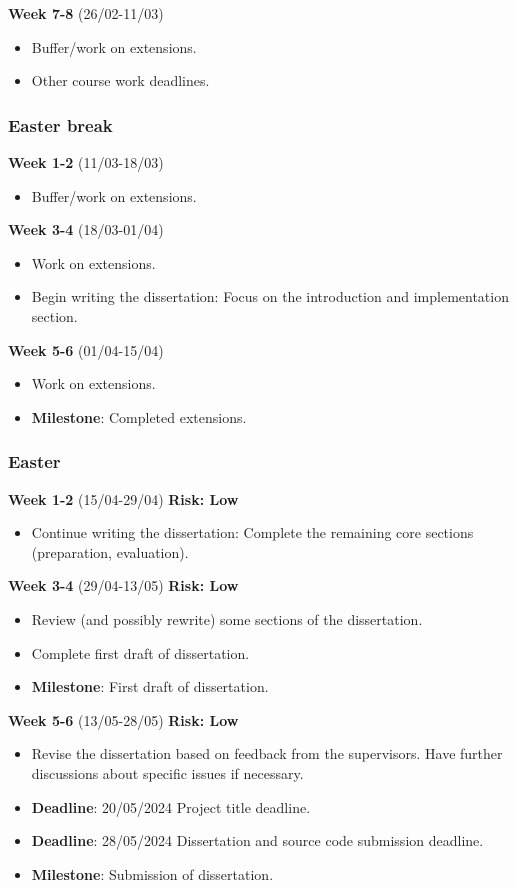 \textbf{Week 7-8} (26/02-11/03)
\begin{itemize}
    \item Buffer/work on extensions.
    \item Other course work deadlines.
\end{itemize}

\subsubsection*{Easter break}
\textbf{Week 1-2} (11/03-18/03)
\begin{itemize}
    \item Buffer/work on extensions.
\end{itemize}

\textbf{Week 3-4} (18/03-01/04)
\begin{itemize}
    \item Work on extensions.
    \item Begin writing the dissertation: Focus on the introduction and implementation section.
\end{itemize}

\textbf{Week 5-6} (01/04-15/04)
\begin{itemize}
    \item Work on extensions.
    \item \textbf{Milestone}: Completed extensions.
\end{itemize}

\subsubsection*{Easter}
\textbf{Week 1-2} (15/04-29/04) \hfill \textbf{Risk: Low}
\begin{itemize}
    \item Continue writing the dissertation: Complete the remaining core sections (preparation, evaluation).
\end{itemize}

\textbf{Week 3-4} (29/04-13/05) \hfill \textbf{Risk: Low}
\begin{itemize}
    \item Review (and possibly rewrite) some sections of the dissertation.
    \item Complete first draft of dissertation.
    \item \textbf{Milestone}: First draft of dissertation.
\end{itemize}

\textbf{Week 5-6} (13/05-28/05) \hfill \textbf{Risk: Low}
\begin{itemize}
    \item Revise the dissertation based on feedback from the supervisors. Have further discussions about specific issues if necessary.
    \item \textbf{Deadline}: 20/05/2024 Project title deadline.
    \item \textbf{Deadline}: 28/05/2024 Dissertation and source code submission deadline.
    \item \textbf{Milestone}: Submission of dissertation.
\end{itemize}